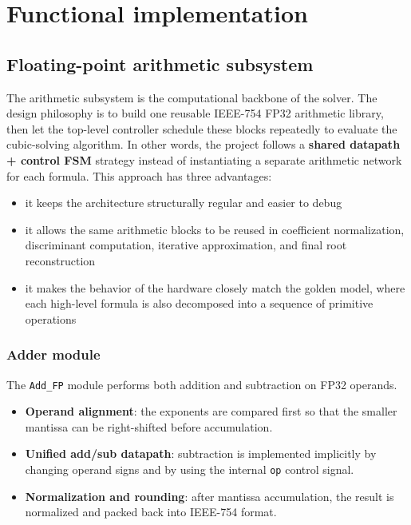 \section{Functional implementation}

\subsection{Floating-point arithmetic subsystem}

The arithmetic subsystem is the computational backbone of the solver. The design philosophy is to build one reusable IEEE-754 FP32 arithmetic library, then let the top-level controller schedule these blocks repeatedly to evaluate the cubic-solving algorithm. In other words, the project follows a \textbf{shared datapath + control FSM} strategy instead of instantiating a separate arithmetic network for each formula. This approach has three advantages:
\begin{itemize}[noitemsep]
    \item it keeps the architecture structurally regular and easier to debug
    \item it allows the same arithmetic blocks to be reused in coefficient normalization, discriminant computation, iterative approximation, and final root reconstruction
    \item it makes the behavior of the hardware closely match the golden model, where each high-level formula is also decomposed into a sequence of primitive operations
\end{itemize}

\subsubsection{Adder module}
The \texttt{Add\_FP} module performs both addition and subtraction on FP32 operands.
\begin{itemize}[noitemsep]
    \item \textbf{Operand alignment}: the exponents are compared first so that the smaller mantissa can be right-shifted before accumulation.
    \item \textbf{Unified add/sub datapath}: subtraction is implemented implicitly by changing operand signs and by using the internal \texttt{op} control signal.
    \item \textbf{Normalization and rounding}: after mantissa accumulation, the result is normalized and packed back into IEEE-754 format.
\end{itemize}

